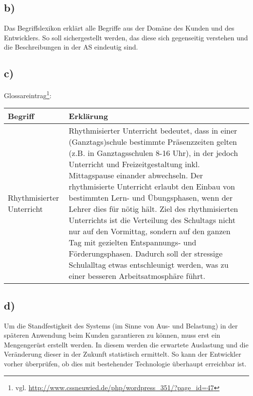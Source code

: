 \documentclass{swp1}
\begin{document}
\subsection*{b)}
Das Begriffslexikon erklärt alle Begriffe aus der Domäne des Kunden und des Entwicklers. So soll
sichergestellt werden, das diese sich gegenseitig verstehen und die Beschreibungen in der AS eindeutig sind.\\
\subsection*{c)}
Glossareintrag\footnote{vgl. \url{http://www.cssneuwied.de/php/wordpress_351/?page_id=47}}:

\begin{tabular}{|p{5cm}|p{10cm}|}\hline
   \textbf{Begriff} & \textbf{Erklärung}\\ \hline \hline
   Rhythmisierter Unterricht & Rhythmisierter Unterricht bedeutet, dass  in einer (Ganztags)schule bestimmte Präsenzzeiten gelten (z.B. in Ganztagsschulen 8-16 Uhr), in der jedoch Unterricht und Freizeitgestaltung inkl. Mittagspause einander abwechseln. Der rhythmisierte Unterricht erlaubt den Einbau von bestimmten Lern- und Übungsphasen, wenn der Lehrer dies für nötig hält. Ziel des rhythmisierten Unterrichts ist die Verteilung des Schultags nicht nur auf den Vormittag, sondern auf den ganzen Tag mit gezielten Entspannungs- und Förderungsphasen. Dadurch soll der stressige Schulalltag etwas entschleunigt werden, was zu einer besseren Arbeitsatmosphäre führt. \\ \hline

 \end{tabular}

\subsection*{d)}
Um die Standfestigkeit des Systems (im Sinne von Aus- und Belastung) in der späteren
Anwendung beim Kunden garantieren zu können, muss erst ein Mengengerüst erstellt werden. In diesem werden die erwartete Auslastung und die Veränderung dieser in der Zukunft statistisch
ermittelt. So kann der Entwickler vorher überprüfen, ob dies mit bestehender Technologie
überhaupt erreichbar ist.
















\begin{figure}
\label{Bild:image}
\end{figure}
\end{document}
